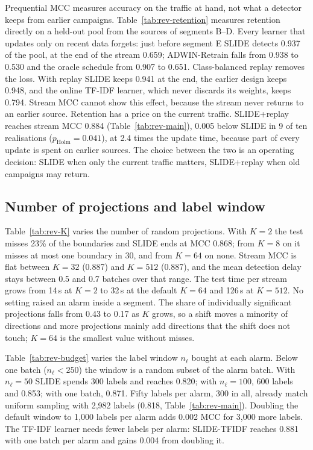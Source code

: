 

Prequential MCC measures accuracy on the traffic at hand, not what a detector keeps from earlier campaigns. Table~\ref{tab:rev-retention} measures retention directly on a held-out pool from the sources of segments B--D. Every learner that updates only on recent data forgets: just before segment E SLIDE detects 0.937 of the pool, at the end of the stream 0.659; ADWIN-Retrain falls from 0.938 to 0.530 and the oracle schedule from 0.907 to 0.651. Class-balanced replay removes the loss. With replay SLIDE keeps 0.941 at the end, the earlier design keeps 0.948, and the online TF-IDF learner, which never discards its weights, keeps 0.794. Stream MCC cannot show this effect, because the stream never returns to an earlier source. Retention has a price on the current traffic. SLIDE+replay reaches stream MCC 0.884 (Table~\ref{tab:rev-main}), 0.005 below SLIDE in 9 of ten realisations ($p_{\mathrm{Holm}}=0.041$), at 2.4 times the update time, because part of every update is spent on earlier sources. The choice between the two is an operating decision: SLIDE when only the current traffic matters, SLIDE+replay when old campaigns may return.



\subsection{Number of projections and label window}\label{sec:K}
Table~\ref{tab:rev-K} varies the number of random projections. With $K=2$ the test misses 23\% of the boundaries and SLIDE ends at MCC 0.868; from $K=8$ on it misses at most one boundary in 30, and from $K=64$ on none. Stream MCC is flat between $K=32$ (0.887) and $K=512$ (0.887), and the mean detection delay stays between 0.5 and 0.7 batches over that range. The test time per stream grows from 14\,s at $K=2$ to 32\,s at the default $K=64$ and 126\,s at $K=512$. No setting raised an alarm inside a segment. The share of individually significant projections falls from 0.43 to 0.17 as $K$ grows, so a shift moves a minority of directions and more projections mainly add directions that the shift does not touch; $K=64$ is the smallest value without misses.



Table~\ref{tab:rev-budget} varies the label window $n_\ell$ bought at each alarm. Below one batch ($n_\ell<250$) the window is a random subset of the alarm batch. With $n_\ell=50$ SLIDE spends 300 labels and reaches 0.820; with $n_\ell=100$, 600 labels and 0.853; with one batch, 0.871. Fifty labels per alarm, 300 in all, already match uniform sampling with 2{,}982 labels (0.818, Table~\ref{tab:rev-main}). Doubling the default window to 1{,}000 labels per alarm adds 0.002 MCC for 3{,}000 more labels. The TF-IDF learner needs fewer labels per alarm: SLIDE-TFIDF reaches 0.881 with one batch per alarm and gains 0.004 from doubling it.


